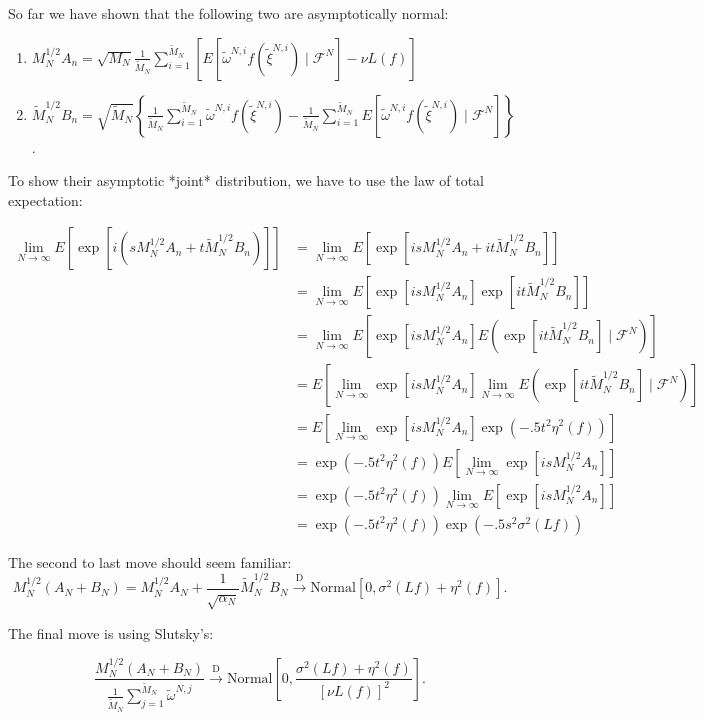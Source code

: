 \documentclass{article}
\begin{document}
So far we have shown that the following two are asymptotically normal:
\begin{enumerate}
\item $M_N^{1/2}A_n = \sqrt{M_N} \frac{1}{\tilde{M}_N} \sum_{i=1}^{\tilde{M}_N} \left[ E[ \tilde{\omega}^{N,i} f(\tilde{\xi}^{N,i}) \mid \mathcal{F}^N] - \nu L(f) \right]$
\item $\tilde{M}_N^{1/2} B_n = \sqrt{\tilde{M}_N}\left\{  \frac{1}{\tilde{M}_N} \sum_{i=1}^{\tilde{M}_N} \tilde{\omega}^{N,i} f(\tilde{\xi}^{N,i}) -  \frac{1}{\tilde{M}_N} \sum_{i=1}^{\tilde{M}_N} E[ \tilde{\omega}^{N,i} f(\tilde{\xi}^{N,i}) \mid \mathcal{F}^N] \right\} $.
\end{enumerate}

To show their asymptotic *joint* distribution, we have to use the law of total expectation:

\begin{align*}
\lim_{N \to \infty}E\left[ \exp\left[i \left(sM_N^{1/2}A_n + t\tilde{M}_N^{1/2} B_n  \right) \right] \right] 
&= \lim_{N \to \infty}E\left[ \exp\left[i sM_N^{1/2}A_n + it\tilde{M}_N^{1/2} B_n   \right] \right] \\
&= \lim_{N \to \infty}E\left[ \exp\left[i sM_N^{1/2}A_n\right]\exp\left[ it\tilde{M}_N^{1/2} B_n   \right] \right] \\
&= \lim_{N \to \infty}E\left[ \exp\left[i sM_N^{1/2}A_n\right] E\left( \exp\left[ it\tilde{M}_N^{1/2} B_n   \right] \mid \mathcal{F}^N\right) \right] \\
&= E\left[ \lim_{N \to \infty}\exp\left[i sM_N^{1/2}A_n\right]\lim_{N \to \infty} E\left( \exp\left[ it\tilde{M}_N^{1/2} B_n   \right] \mid \mathcal{F}^N\right) \right] \tag{DCT} \\
&= E\left[ \lim_{N \to \infty}\exp\left[i sM_N^{1/2}A_n\right] \exp\left(-.5t^2\eta^2(f) \right) \right] \\
&= \exp\left(-.5t^2\eta^2(f) \right) E\left[ \lim_{N \to \infty}\exp\left[i sM_N^{1/2}A_n\right]  \right] \\
&= \exp\left(-.5t^2\eta^2(f) \right) \lim_{N \to \infty} E\left[ \exp\left[i sM_N^{1/2}A_n\right]  \right] \tag{DCT} \\
&= \exp\left(-.5t^2\eta^2(f) \right) \exp\left(- .5s^2\sigma^2(Lf) \right)
\end{align*}

The second to last move should seem familiar:
$$
M_N^{1/2}(A_N + B_N) = M_N^{1/2}A_N + \frac{1}{\sqrt{\alpha_N}} \tilde{M}_N^{1/2} B_N \overset{\text{D}}{\to} \text{Normal}\left[0, \sigma^2(Lf) + \eta^2(f) \right].
$$

The final move is using Slutsky's:

$$
\frac{M_N^{1/2}(A_N + B_N)}{\frac{1}{\tilde{M}_N} \sum_{j=1}^{\tilde{M}_N} \tilde{\omega}^{N,j}}  \overset{\text{D}}{\to} \text{Normal}\left[0, \frac{\sigma^2(Lf) + \eta^2(f)}{[\nu L (f) ]^2} \right].
$$
\end{document}
